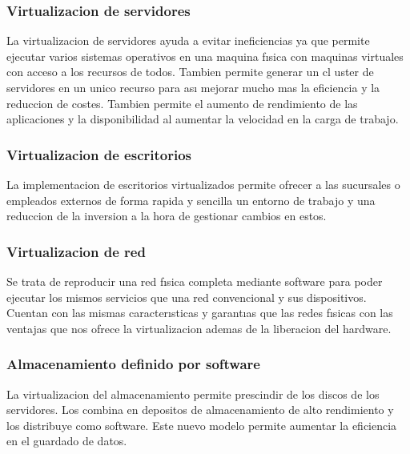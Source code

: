 \documentclass[preprint,12pt]{elsarticle}
\begin{document}
\subsubsection{Virtualizacion de servidores}
La virtualizacion de servidores ayuda a evitar ineficiencias ya que permite ejecutar varios  sistemas operativos en una maquina fısica con maquinas virtuales con acceso a los recursos de todos. Tambien permite generar un cl uster de servidores en un unico recurso para ası mejorar mucho mas la eficiencia y la reduccion de costes. Tambien permite el aumento de rendimiento de las aplicaciones y la disponibilidad al aumentar la velocidad en la carga de trabajo.

\subsubsection{Virtualizacion de escritorios}
La implementacion de escritorios virtualizados permite ofrecer a las sucursales o empleados externos de forma rapida y sencilla un entorno de trabajo y una reduccion de la inversion a la hora de gestionar cambios en estos.

\subsubsection{Virtualizacion de red}
Se trata de reproducir una red fısica completa mediante software para poder ejecutar los mismos servicios que una red convencional y sus dispositivos. Cuentan con las mismas caracterısticas y garantıas que las redes fısicas con las ventajas que nos ofrece la virtualizacion ademas de la liberacion del hardware.

\subsubsection{Almacenamiento definido por software}
La virtualizacion del almacenamiento permite prescindir de los discos de los servidores. Los combina en depositos de almacenamiento de alto rendimiento y los distribuye como software. Este nuevo modelo permite aumentar la eficiencia en el guardado de datos.
\end{document}
